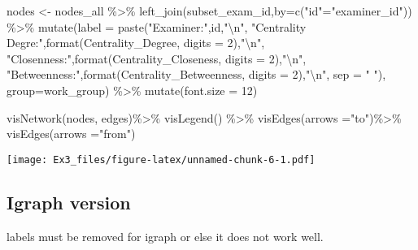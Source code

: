\documentclass[
]{article}
\newenvironment{Shaded}{\begin{snugshade}}{\end{snugshade}}
\newcommand{\AttributeTok}[1]{\textcolor[rgb]{0.77,0.63,0.00}{#1}}
\newcommand{\DecValTok}[1]{\textcolor[rgb]{0.00,0.00,0.81}{#1}}
\newcommand{\FunctionTok}[1]{\textcolor[rgb]{0.00,0.00,0.00}{#1}}
\newcommand{\NormalTok}[1]{#1}
\newcommand{\OtherTok}[1]{\textcolor[rgb]{0.56,0.35,0.01}{#1}}
\newcommand{\SpecialCharTok}[1]{\textcolor[rgb]{0.00,0.00,0.00}{#1}}
\newcommand{\StringTok}[1]{\textcolor[rgb]{0.31,0.60,0.02}{#1}}
\begin{document}
\begin{Shaded}
\begin{Highlighting}[]
\NormalTok{nodes }\OtherTok{\textless{}{-}}\NormalTok{ nodes\_all }\SpecialCharTok{\%\textgreater{}\%} 
  \FunctionTok{left\_join}\NormalTok{(subset\_exam\_id,}\AttributeTok{by=}\FunctionTok{c}\NormalTok{(}\StringTok{"id"}\OtherTok{=}\StringTok{"examiner\_id"}\NormalTok{)) }\SpecialCharTok{\%\textgreater{}\%}
  \FunctionTok{mutate}\NormalTok{(}\AttributeTok{label =} \FunctionTok{paste}\NormalTok{(}\StringTok{"Examiner:"}\NormalTok{,id,}\StringTok{"}\SpecialCharTok{\textbackslash{}n}\StringTok{"}\NormalTok{,}
                      \StringTok{"Centrality Degre:"}\NormalTok{,}\FunctionTok{format}\NormalTok{(Centrality\_Degree, }\AttributeTok{digits =} \DecValTok{2}\NormalTok{),}\StringTok{"}\SpecialCharTok{\textbackslash{}n}\StringTok{"}\NormalTok{,}
                      \StringTok{"Closenness:"}\NormalTok{,}\FunctionTok{format}\NormalTok{(Centrality\_Closeness, }\AttributeTok{digits =} \DecValTok{2}\NormalTok{),}\StringTok{"}\SpecialCharTok{\textbackslash{}n}\StringTok{"}\NormalTok{,}
                      \StringTok{"Betweenness:"}\NormalTok{,}\FunctionTok{format}\NormalTok{(Centrality\_Betweenness, }\AttributeTok{digits =} \DecValTok{2}\NormalTok{),}\StringTok{"}\SpecialCharTok{\textbackslash{}n}\StringTok{"}\NormalTok{,}
                      \AttributeTok{sep =} \StringTok{" "}\NormalTok{),}
         \AttributeTok{group=}\NormalTok{work\_group) }\SpecialCharTok{\%\textgreater{}\%}
  \FunctionTok{mutate}\NormalTok{(}\AttributeTok{font.size =} \DecValTok{12}\NormalTok{) }

\FunctionTok{visNetwork}\NormalTok{(nodes, edges)}\SpecialCharTok{\%\textgreater{}\%}
  \FunctionTok{visLegend}\NormalTok{() }\SpecialCharTok{\%\textgreater{}\%}
  \FunctionTok{visEdges}\NormalTok{(}\AttributeTok{arrows =}\StringTok{"to"}\NormalTok{)}\SpecialCharTok{\%\textgreater{}\%}
  \FunctionTok{visEdges}\NormalTok{(}\AttributeTok{arrows =}\StringTok{"from"}\NormalTok{)}
\end{Highlighting}
\end{Shaded}

\texttt{[image: Ex3\_files/figure-latex/unnamed-chunk-6-1.pdf]}

\hypertarget{igraph-version}{%
\subsection{Igraph version}\label{igraph-version}}

labels must be removed for igraph or else it does not work well.
\end{document}
